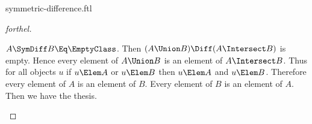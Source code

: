 \documentclass{stex}
\begin{document}
\begin{smodule}{symmetric-difference.ftl}
\begin{proof}[forthel]
  \begin{case}{$A \SymDiff B \Eq \EmptyClass$.}
    Then $(A \Union B) \Diff (A \Intersect B)$ is empty.
    Hence every element of $A \Union B$ is an element of $A \Intersect B$.
    Thus for all objects $u$ if $u \Elem A$ or $u \Elem B$ then $u \Elem A$ and $u \Elem B$.
    Therefore every element of $A$ is an element of $B$.
    Every element of $B$ is an element of $A$.
    Then we have the thesis.
  \end{case}
\end{proof}

\end{smodule}
\end{document}

